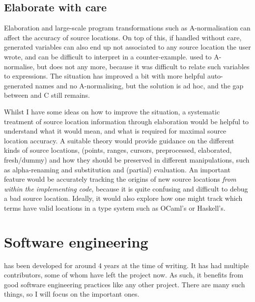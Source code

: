 \subsection{Elaborate with care}

Elaboration and large-scale program transformations such as A-normalisation can
affect the accuracy of source locations. On top of this, if handled without
care, generated variables can also end up not associated to any source location
the user wrote, and can be difficult to interpret in a counter-example. 
used to A-normalise, but does not any
more, because it was difficult to relate such variables to 
expressions. The situation has improved a bit with more helpful auto-generated
names and no A-normalising, but the solution is ad hoc, and the gap between
 and C still remains.

Whilst I have some ideas on how to improve the situation, a systematic treatment of source location information through
elaboration would be helpful to understand what it would mean, and what is
required for maximal source location accuracy. A suitable theory would provide
guidance on the different kinds of source locations, (points, ranges, cursors,
preprocessed, elaborated, fresh/dummy) and how they should be preserved in
different manipulations, such as alpha-renaming and substitution and (partial)
evaluation. An important feature would be accurately tracking the origins of
new source locations \emph{from within the implementing code}, because it is
quite confusing and difficult to debug a bad source location. Ideally, it would
also explore how one might track which terms have valid locations in a type
system such as OCaml's or Haskell's.

\section{Software engineering}

 has been developed for around 4 years at the time of writing. It has
had multiple contributors, some of whom have left the project now. As such,
it benefits from good software engineering practices like any other project.
There are many such things, so I will focus on the important ones.

